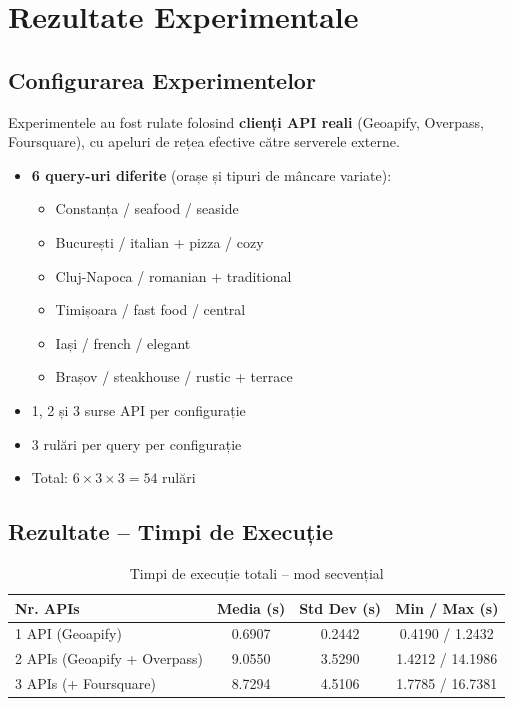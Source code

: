 \documentclass[12pt,a4paper]{article}
\begin{document}
\section{Rezultate Experimentale}

\subsection{Configurarea Experimentelor}

Experimentele au fost rulate folosind \textbf{clienți API reali} (Geoapify, Overpass, Foursquare), cu apeluri de rețea efective către serverele externe.

\begin{itemize}
    \item \textbf{6 query-uri diferite} (orașe și tipuri de mâncare variate):
    \begin{itemize}
        \item Constanța / seafood / seaside
        \item București / italian + pizza / cozy
        \item Cluj-Napoca / romanian + traditional
        \item Timișoara / fast food / central
        \item Iași / french / elegant
        \item Brașov / steakhouse / rustic + terrace
    \end{itemize}
    \item 1, 2 și 3 surse API per configurație
    \item 3 rulări per query per configurație
    \item Total: $6 \times 3 \times 3 = 54$ rulări
\end{itemize}

\subsection{Rezultate -- Timpi de Execuție}

\begin{table}[H]
\centering
\begin{tabular}{lccc}
\toprule
\textbf{Nr. APIs} & \textbf{Media (s)} & \textbf{Std Dev (s)} & \textbf{Min / Max (s)} \\
\midrule
1 API (Geoapify)              & 0.6907 & 0.2442 & 0.4190 / 1.2432 \\
2 APIs (Geoapify + Overpass)  & 9.0550 & 3.5290 & 1.4212 / 14.1986 \\
3 APIs (+ Foursquare)         & 8.7294 & 4.5106 & 1.7785 / 16.7381 \\
\bottomrule
\end{tabular}
\caption{Timpi de execuție totali -- mod secvențial}
\label{tab:results}
\end{table}
\end{document}
